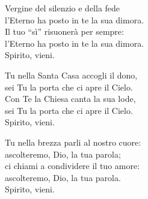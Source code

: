 \strofa Vergine del silenzio e della fede\\
l'Eterno ha posto in te la sua dimora.\\
Il tuo ``sì'' risuonerà per sempre:\\
l'Eterno ha posto in te la sua dimora.\\
Spirito, vieni.

\spazio


\spazio

\strofa Tu nella Santa Casa accogli il dono,\\
sei Tu la porta che ci apre il Cielo.\\
Con Te la Chiesa canta la sua lode,\\
sei Tu la porta che ci apre il Cielo.\\
Spirito, vieni.

\spazio


\spazio

\strofa Tu nella brezza parli al nostro cuore:\\
ascolteremo, Dio, la tua parola;\\
ci chiami a condividere il tuo amore:\\
ascolteremo, Dio, la tua parola.\\
Spirito, vieni.

\spazio

